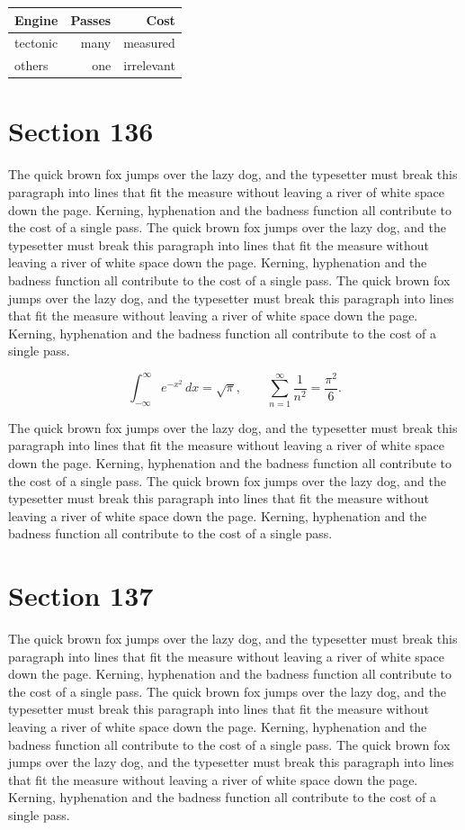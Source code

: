 \documentclass{article}
\begin{document}
\begin{center}
\begin{tabular}{lrr}
\toprule
Engine & Passes & Cost \\
\midrule
tectonic & many & measured \\
others & one & irrelevant \\
\bottomrule
\end{tabular}
\end{center}

\section{Section 136}
The quick brown fox jumps over the lazy dog, and the typesetter must break this paragraph into lines that fit the measure without leaving a river of white space down the page. Kerning, hyphenation and the badness function all contribute to the cost of a single pass. The quick brown fox jumps over the lazy dog, and the typesetter must break this paragraph into lines that fit the measure without leaving a river of white space down the page. Kerning, hyphenation and the badness function all contribute to the cost of a single pass. The quick brown fox jumps over the lazy dog, and the typesetter must break this paragraph into lines that fit the measure without leaving a river of white space down the page. Kerning, hyphenation and the badness function all contribute to the cost of a single pass. 

\begin{equation}
\int_{-\infty}^{\infty} e^{-x^{2}}\,dx = \sqrt{\pi}, \qquad
\sum_{n=1}^{\infty} \frac{1}{n^{2}} = \frac{\pi^{2}}{6}.
\end{equation}

The quick brown fox jumps over the lazy dog, and the typesetter must break this paragraph into lines that fit the measure without leaving a river of white space down the page. Kerning, hyphenation and the badness function all contribute to the cost of a single pass. The quick brown fox jumps over the lazy dog, and the typesetter must break this paragraph into lines that fit the measure without leaving a river of white space down the page. Kerning, hyphenation and the badness function all contribute to the cost of a single pass. 
\section{Section 137}
The quick brown fox jumps over the lazy dog, and the typesetter must break this paragraph into lines that fit the measure without leaving a river of white space down the page. Kerning, hyphenation and the badness function all contribute to the cost of a single pass. The quick brown fox jumps over the lazy dog, and the typesetter must break this paragraph into lines that fit the measure without leaving a river of white space down the page. Kerning, hyphenation and the badness function all contribute to the cost of a single pass. The quick brown fox jumps over the lazy dog, and the typesetter must break this paragraph into lines that fit the measure without leaving a river of white space down the page. Kerning, hyphenation and the badness function all contribute to the cost of a single pass. 
\end{document}
